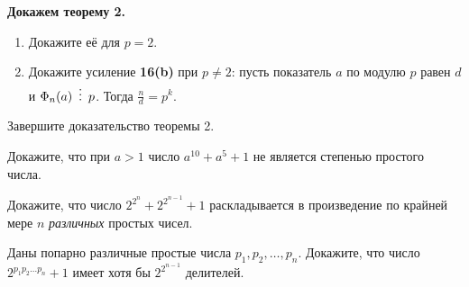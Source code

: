 \documentclass{article}
\begin{document}
\begin{enumerate_boxed}
        \item \textbf{Докажем теорему 2.}
        \begin{enumerate}
            \item Докажите её для $p = 2$.
            \item Докажите усиление \textbf{16(b)} при $p \neq 2$: пусть показатель $a$ по модулю $p$ равен $d$ и $\Phi_n(a) \,\,\,\vdots\,\,\, p$.
            Тогда $\frac{n}{d} = p^k$.
        \end{enumerate}
        Завершите доказательство теоремы 2.

        \item Докажите, что при $a > 1$ число $a^{10} + a^5 + 1$ не является степенью простого числа.

        \item Докажите, что число $2^{2^n} + 2^{2^{n-1}} + 1$ раскладывается в произведение по крайней мере $n$ \textit{различных} простых чисел.

        \item Даны попарно различные простые числа $p_1,p_2,\ldots,p_n$.
        Докажите, что число $2^{p_{1}p_2\ldots p_n} + 1$ имеет хотя бы $2^{2^{n-1}}$ делителей.


    \end{enumerate_boxed}
\end{document}
